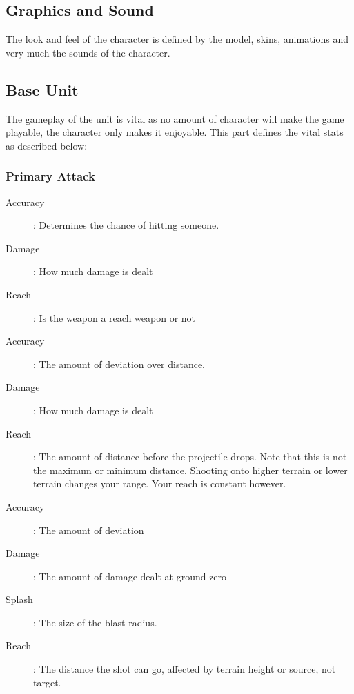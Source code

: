 \documentclass[a4paper]{article}
\begin{document}
\subsection{Graphics and Sound}

The look and feel of the character is defined by the model, skins, animations and very much the sounds of the character.

\subsection{Base Unit}

The gameplay of the unit is vital as no amount of character will make the game playable, the character only makes it enjoyable. This part defines the vital stats as described below:

\subsubsection{Primary Attack}

\begin{description}
\item[Accuracy]: Determines the chance of hitting someone.
\item[Damage]: How much damage is dealt
\item[Reach]: Is the weapon a reach weapon or not
\end{description}

\begin{description}
\item[Accuracy]: The amount of deviation over distance.
\item[Damage]: How much damage is dealt
\item[Reach]: The amount of distance before the projectile drops. Note that  this is not the maximum or minimum distance. Shooting onto higher terrain or lower terrain changes your range. Your reach is constant however.
\end{description}

\begin{description}
\item[Accuracy]: The amount of deviation
\item[Damage]: The amount of damage dealt at ground zero
\item[Splash]: The size of the blast radius.
\item[Reach]: The distance the shot can go, affected by terrain height or source, not target.
\end{description}
\end{document}
